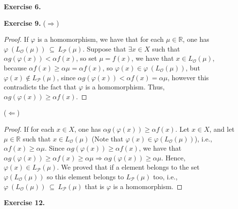 \documentclass[12pt]{article}
\begin{document}
\begin{enumerate}
\begin{proof}
	\end{proof}
	\item[\textbf{Exercise 6.}] 
	\item[\textbf{Exercise 9.}] ($\Rightarrow$)
	\begin{proof}
		If $\varphi$ is a homomorphism, we have that for each $\mu \in \mathbb{R}$, one has $\varphi~(L_{\mathcal{O}}(\mu))~\subseteq~L_{\mathcal{P}}(\mu)$. 
		Suppose that $\exists x \in X$ such that $\alpha g(\varphi(x)) < \alpha f(x)$, so set $\mu = f(x)$, we have that $x \in L_{\mathcal{O}}(\mu)$, because $\alpha f(x) \geq \alpha \mu = \alpha f(x)$, so $\varphi(x) \in \varphi~(L_{\mathcal{O}}(\mu))$, but $\varphi (x) \notin L_{\mathcal{P}}(\mu)$, since $\alpha g(\varphi(x)) < \alpha f(x) = \alpha \mu$, however this contradicts the fact that $\varphi$ is a homomorphism. Thus, $\alpha g(\varphi(x)) \geq \alpha f(x)$.
	\end{proof} 
	($\Leftarrow$)
	\begin{proof}
		If for each $x \in X$, one has $\alpha g(\varphi (x)) \geq \alpha f(x)$. Let $x \in X$, and let $\mu \in \mathbb{R}$ such that $x \in L_{\mathcal{O}}(\mu)$ (Note that $\varphi (x) \in \varphi(L_{\mathcal{O}}(\mu))$), i.e., $\alpha f(x) \geq \alpha \mu$. Since $\alpha g(\varphi (x)) \geq \alpha f(x)$, we have that $\alpha g(\varphi (x)) \geq \alpha f(x) \geq \alpha \mu \Rightarrow \alpha g(\varphi (x)) \geq \alpha \mu$. Hence, $\varphi(x) \in L_{\mathcal{P}}(\mu)$. We proved that if a element belongs to the set $\varphi(L_{\mathcal{O}}(\mu))$ so this element belongs to $L_{\mathcal{P}}(\mu)$ too, i.e., $\varphi~(L_{\mathcal{O}}(\mu))~\subseteq~L_{\mathcal{P}}(\mu)$ that is $\varphi$ is a homomorphism.
	\end{proof}
	\item[\textbf{Exercise 12.}]
\end{enumerate}
\end{document}
